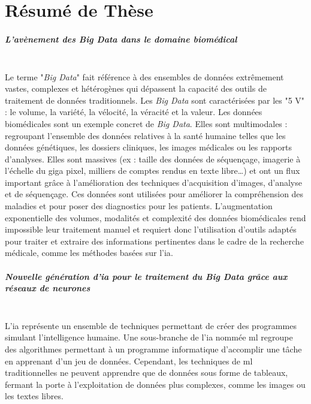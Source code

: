 \chapter{Résumé de Thèse}
\paragraph{\textbf{L’avènement des \textit{Big Data} dans le domaine biomédical}}\mbox{}\\

Le terme "\textit{Big Data}" fait référence à des ensembles de données extrêmement vastes, complexes et hétérogènes qui dépassent la capacité des outils de traitement de données traditionnels. Les \textit{Big Data} sont caractérisées par les "5 V" : le volume, la variété, la vélocité, la véracité et la valeur. Les données biomédicales sont un exemple concret de \textit{Big Data}. Elles sont multimodales : regroupant l’ensemble des données relatives à la santé humaine telles que les données génétiques, les dossiers cliniques, les images médicales ou les rapports d’analyses. Elles sont massives (ex : taille des données de séquençage, imagerie à l’échelle du giga pixel, milliers de comptes rendus en texte libre…) et ont un flux important grâce à l’amélioration des techniques d’acquisition d’images, d’analyse et de séquençage. Ces données sont utilisées pour améliorer la compréhension des maladies et pour poser des diagnostics pour les patients. L’augmentation exponentielle des volumes, modalités et complexité des données biomédicales rend impossible leur traitement manuel et requiert donc l’utilisation d’outils adaptés pour traiter et extraire des informations pertinentes dans le cadre de la recherche médicale, comme les méthodes basées sur l’\gls{ia}.

\paragraph{\textbf{Nouvelle génération d’\gls{ia} pour le traitement du \textit{Big Data} grâce aux réseaux de neurones}}\mbox{}\\

L’\gls{ia} représente un ensemble de techniques permettant de créer des programmes simulant l’intelligence humaine. Une sous-branche de l’\gls{ia} nommée \gls{ml} regroupe des algorithmes permettant à un programme informatique d’accomplir une tâche en apprenant d’un jeu de données. Cependant, les techniques de \gls{ml} traditionnelles ne peuvent apprendre que de données sous forme de tableaux, fermant la porte à l’exploitation de données plus complexes, comme les images ou les textes libres.

